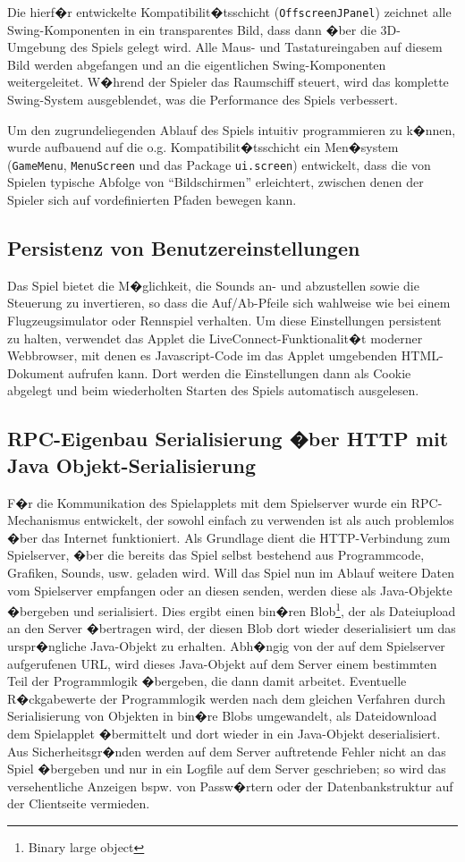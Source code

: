 \documentclass[a4paper,12pt]{scrartcl}
\begin{document}
Die hierf�r entwickelte Kompatibilit�tsschicht (\texttt{OffscreenJPanel})
zeichnet alle Swing-Komponenten in ein transparentes Bild, dass dann �ber die 3D-Umgebung des Spiels
gelegt wird. Alle Maus- und Tastatureingaben auf diesem Bild werden abgefangen und an
die eigentlichen Swing-Komponenten weitergeleitet. W�hrend der Spieler das Raumschiff
steuert, wird das komplette Swing-System ausgeblendet, was die Performance des Spiels
verbessert.

Um den zugrundeliegenden Ablauf des Spiels intuitiv programmieren zu k�nnen, wurde
aufbauend auf die o.g. Kompatibilit�tsschicht ein Men�system (\texttt{GameMenu}, \texttt{MenuScreen} und das Package \texttt{ui.screen}) entwickelt, dass die von Spielen typische
Abfolge von "`Bildschirmen"' erleichtert, zwischen denen der Spieler sich auf vordefinierten Pfaden
bewegen kann.

\subsection{Persistenz von Benutzereinstellungen}
Das Spiel bietet die M�glichkeit, die Sounds an- und abzustellen sowie die Steuerung zu
invertieren, so dass die Auf/Ab-Pfeile sich wahlweise wie bei einem Flugzeugsimulator oder
Rennspiel verhalten. Um diese Einstellungen persistent zu halten, verwendet das Applet die
LiveConnect-Funktionalit�t moderner Webbrowser, mit denen es Javascript-Code im das
Applet umgebenden HTML-Dokument aufrufen kann. Dort werden die Einstellungen dann
als Cookie abgelegt und beim wiederholten Starten des Spiels automatisch ausgelesen.

\subsection{RPC-Eigenbau Serialisierung �ber HTTP mit Java
Objekt-Serialisierung}
F�r die Kommunikation des Spielapplets mit dem
Spielserver wurde ein RPC-Mecha\-nismus entwickelt, der
sowohl einfach zu verwenden ist als auch problemlos �ber das Internet funktioniert. Als Grundlage dient die HTTP-Verbindung zum Spielserver, �ber die bereits
das Spiel selbst bestehend aus Programmcode, Grafiken, Sounds, usw. geladen wird.
Will das Spiel nun im Ablauf weitere Daten vom Spielserver empfangen oder an diesen
senden, werden diese als Java-Objekte �bergeben und serialisiert. Dies ergibt einen bin�ren
Blob\footnote{Binary large object}, der als Dateiupload an den Server �bertragen wird, der diesen Blob dort wieder
deserialisiert um das urspr�ngliche Java-Objekt zu erhalten. Abh�ngig von der auf dem
Spielserver aufgerufenen URL, wird dieses Java-Objekt auf dem Server einem bestimmten
Teil der Programmlogik �bergeben, die dann damit arbeitet. Eventuelle
R�ckgabewerte der Programmlogik werden nach dem gleichen Verfahren durch Serialisierung von Objekten
in bin�re Blobs umgewandelt, als Dateidownload dem Spielapplet �bermittelt und dort
wieder in ein Java-Objekt deserialisiert. Aus Sicherheitsgr�nden werden auf dem Server
auftretende Fehler nicht an das Spiel �bergeben und nur in ein Logfile auf dem Server
geschrieben; so wird das versehentliche Anzeigen bspw. von Passw�rtern oder der
Datenbankstruktur auf der Clientseite vermieden.
\end{document}
